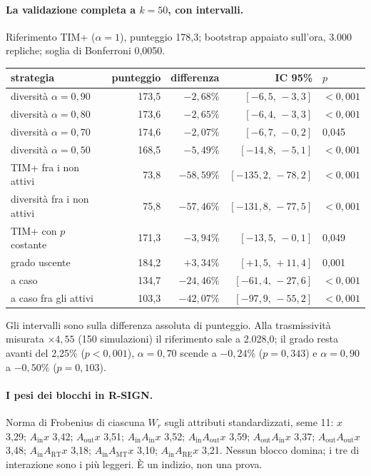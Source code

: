 \documentclass[11pt,a4paper]{article}
\begin{document}
\paragraph{La validazione completa a $k=50$, con intervalli.} Riferimento TIM+ ($\alpha = 1$), punteggio 178,3; bootstrap appaiato sull'ora, 3.000 repliche; soglia di Bonferroni 0,0050.
\begin{center}\small
\begin{tabular}{lrrrl}
\toprule
strategia & punteggio & differenza & IC 95\% & $p$ \\
\midrule
diversità $\alpha=0{,}90$ & 173,5 & $-2{,}68\%$ & $[-6{,}5,\,-3{,}3]$ & $<0{,}001$ \\
diversità $\alpha=0{,}80$ & 173,6 & $-2{,}65\%$ & $[-6{,}4,\,-3{,}3]$ & $<0{,}001$ \\
diversità $\alpha=0{,}70$ & 174,6 & $-2{,}07\%$ & $[-6{,}7,\,-0{,}2]$ & 0,045 \\
diversità $\alpha=0{,}50$ & 168,5 & $-5{,}49\%$ & $[-14{,}8,\,-5{,}1]$ & $<0{,}001$ \\
TIM+ fra i non attivi & 73,8 & $-58{,}59\%$ & $[-135{,}2,\,-78{,}2]$ & $<0{,}001$ \\
diversità fra i non attivi & 75,8 & $-57{,}46\%$ & $[-131{,}8,\,-77{,}5]$ & $<0{,}001$ \\
TIM+ con $p$ costante & 171,3 & $-3{,}94\%$ & $[-13{,}5,\,-0{,}1]$ & 0,049 \\
grado uscente & 184,2 & $+3{,}34\%$ & $[+1{,}5,\,+11{,}4]$ & 0,001 \\
a caso & 134,7 & $-24{,}46\%$ & $[-61{,}4,\,-27{,}6]$ & $<0{,}001$ \\
a caso fra gli attivi & 103,3 & $-42{,}07\%$ & $[-97{,}9,\,-55{,}2]$ & $<0{,}001$ \\
\bottomrule
\end{tabular}
\end{center}
Gli intervalli sono sulla differenza assoluta di punteggio. Alla trasmissività misurata $\times 4{,}55$ (150 simulazioni) il riferimento sale a 2.028,0; il grado resta avanti del 2,25\% ($p < 0{,}001$), $\alpha = 0{,}70$ scende a $-0{,}24\%$ ($p = 0{,}343$) e $\alpha = 0{,}90$ a $-0{,}50\%$ ($p = 0{,}103$).

\paragraph{I pesi dei blocchi in R-SIGN.} Norma di Frobenius di ciascuna $W_r$ sugli attributi standardizzati, seme 11: $x$ 3,29; $A_{\mathrm{in}}x$ 3,42; $A_{\mathrm{out}}x$ 3,51; $A_{\mathrm{in}}A_{\mathrm{in}}x$ 3,52; $A_{\mathrm{in}}A_{\mathrm{out}}x$ 3,59; $A_{\mathrm{out}}A_{\mathrm{in}}x$ 3,37; $A_{\mathrm{out}}A_{\mathrm{out}}x$ 3,48; $A_{\mathrm{in}}A_{\mathrm{RT}}x$ 3,18; $A_{\mathrm{in}}A_{\mathrm{MT}}x$ 3,10; $A_{\mathrm{in}}A_{\mathrm{RE}}x$ 3,21. Nessun blocco domina; i tre di interazione sono i più leggeri. È un indizio, non una prova.
\end{document}
